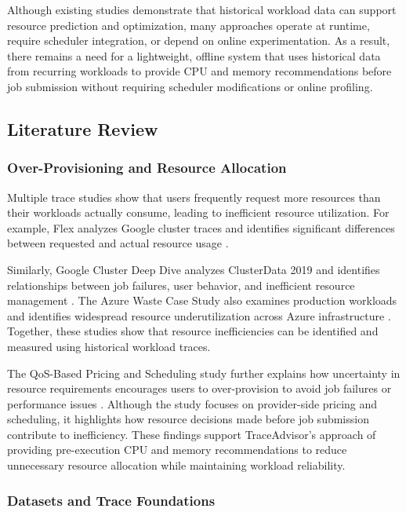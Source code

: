 \documentclass{IEEEtran}
\begin{document}
Although existing studies demonstrate that historical workload data can support resource prediction and optimization, many approaches operate at runtime, require scheduler integration, or depend on online experimentation. As a result, there remains a need for a lightweight, offline system that uses historical data from recurring workloads to provide CPU and memory recommendations before job submission without requiring scheduler modifications or online profiling.

\subsection{Literature Review}\label{sec:1.3}

\subsubsection{Over-Provisioning and Resource Allocation}\label{sec:1.3.1}

Multiple trace studies show that users frequently request more resources than their workloads actually consume, leading to inefficient resource utilization. For example, Flex analyzes Google cluster traces and identifies significant differences between requested and actual resource usage \cite{ref1}.

Similarly, Google Cluster Deep Dive analyzes ClusterData 2019 and identifies relationships between job failures, user behavior, and inefficient resource management \cite{ref5}. The Azure Waste Case Study also examines production workloads and identifies widespread resource underutilization across Azure infrastructure \cite{ref6}. Together, these studies show that resource inefficiencies can be identified and measured using historical workload traces.

The QoS-Based Pricing and Scheduling study further explains how uncertainty in resource requirements encourages users to over-provision to avoid job failures or performance issues \cite{ref4}. Although the study focuses on provider-side pricing and scheduling, it highlights how resource decisions made before job submission contribute to inefficiency. These findings support TraceAdvisor's approach of providing pre-execution CPU and memory recommendations to reduce unnecessary resource allocation while maintaining workload reliability.

\subsubsection{Datasets and Trace Foundations}\label{sec:1.3.2}
\end{document}
